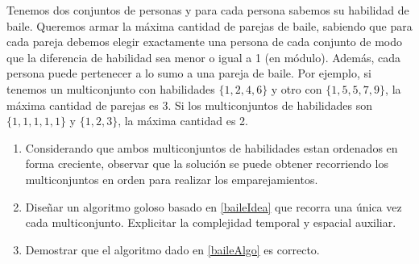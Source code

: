 

\item Tenemos dos conjuntos de personas y para cada persona sabemos su habilidad de baile. Queremos armar la máxima cantidad de parejas de baile, sabiendo que para cada pareja debemos elegir exactamente una persona de cada conjunto de modo que la diferencia de habilidad sea menor o igual a 1 (en módulo). Además, cada persona puede pertenecer a lo sumo a una pareja de baile.  Por ejemplo, si tenemos un multiconjunto con habilidades $\{ 1, 2, 4, 6 \}$ y otro con $\{ 1, 5, 5, 7, 9 \}$, la máxima cantidad de parejas es 3. Si los multiconjuntos de habilidades son $\{ 1, 1, 1, 1, 1 \}$ y $\{ 1, 2, 3 \}$, la máxima cantidad es 2.

\begin{enumerate}[label=$\alph*)$,ref=$\alph*)$]
\item Considerando que ambos multiconjuntos de habilidades estan ordenados en forma creciente, observar que la solución se puede obtener recorriendo los multiconjuntos en orden para realizar los emparejamientos.
\label{baileIdea}
\item Diseñar un algoritmo goloso basado en \ref{baileIdea} que recorra una única vez cada multiconjunto. Explicitar la complejidad temporal y espacial auxiliar.
\label{baileAlgo}
\item Demostrar que el algoritmo dado en \ref{baileAlgo} es correcto.
\end{enumerate}



